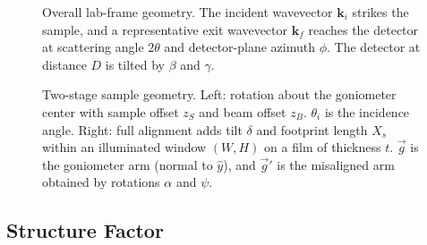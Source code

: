 \begin{figure}[H]
  \centering
  \resizebox{0.6\linewidth}{!}{}
  \caption{
  Overall lab-frame geometry.
  The incident wavevector $\mathbf{k}_i$ strikes the sample, and a representative exit wavevector $\mathbf{k}_f$ reaches the detector at scattering angle $2\theta$ and detector-plane azimuth $\phi$.
  The detector at distance $D$ is tilted by $\beta$ and $\gamma$.
  }
  \label{fig:waxs_geometry_system}
\end{figure}

\begin{figure}[H]
  \centering
  \begin{subfigure}[t]{0.48\linewidth}
    \centering
    \resizebox{\linewidth}{!}{}
    \caption{}
    \label{fig:waxs_geometry_sample_rot}
  \end{subfigure}
  \hfill
  \begin{subfigure}[t]{0.48\linewidth}
    \centering
    \resizebox{\linewidth}{!}{}
    \caption{}
    \label{fig:waxs_geometry_sample_full}
  \end{subfigure}
\caption{
Two-stage sample geometry.
Left: rotation about the goniometer center with sample offset $z_S$ and beam offset $z_B$. $\theta_i$ is the incidence angle.
Right: full alignment adds tilt $\delta$ and footprint length $X_s$ within an illuminated window $(W,H)$ on a film of thickness $t$.
$\vec{g}$ is the goniometer arm (normal to $\hat{y}$), and $\vec{g}'$ is the misaligned arm obtained by rotations $\alpha$ and $\psi$.}

  \label{fig:waxs_geometry_sample_triptych}
\end{figure}

\subsection{Structure Factor}
\label{sec:structure_factor}

